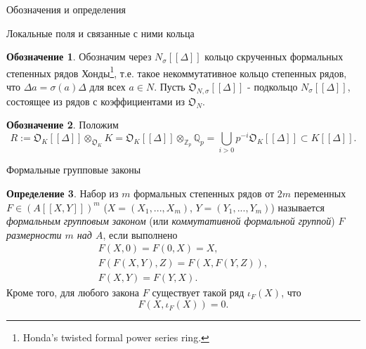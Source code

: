\documentclass[a4paper,14pt]{extarticle}
\theoremstyle{definition}
\newtheorem{definition}{Определение}[section]
\newtheorem{denotation}[definition]{Обозначение}
\newcommand{\bQ}{\mathbb{Q}}
\newcommand{\bZ}{\mathbb{Z}}
\newcommand{\fO}{\mathfrak{O}}
\begin{document}
\begin{section}{Обозначения и определения}
\begin{subsection}{Локальные поля и связанные с ними кольца}
\begin{denotation}\label{denote:1.5:W}
    Обозначим через ${ N_\sigma[[\Delta]] }$ кольцо скрученных формальных степенных рядов Хонды\footnote{
        Honda’s twisted formal power series ring.
    }, т.е. такое некоммутативное кольцо степенных рядов, что ${ \Delta a = \sigma(a) \Delta }$ для всех ${ a \in N }$. Пусть ${ \fO_{N, \sigma}[[\Delta]] }$ - подкольцо ${ N_\sigma[[\Delta]] }$, состоящее из рядов с коэффициентами из $\fO_N$.
\end{denotation}

\begin{denotation}\label{denote:1.3:R}
    Положим
    \begin{equation*}
        R :=
        \fO_K[[\Delta]] \otimes_{\fO_K} K =
        \fO_K[[\Delta]] \otimes_{\bZ_p} \bQ_p =
        \bigcup_{i > 0} p^{-i} \fO_K[[\Delta]] \subset
        K[[\Delta]].
    \end{equation*}
\end{denotation}

\end{subsection}

\begin{subsection}{Формальные групповые законы}

\begin{definition}\label{def:2.0:formal_group}
    Набор из $m$ формальных степенных рядов от ${ 2 m }$ переменных ${ F \in (A[[X, Y]])^m }$ (${ X = (X_1, ..., X_m) }$, ${ Y = (Y_1, ..., Y_m) }$) называется \textit{формальным групповым законом} (или \textit{коммутативной формальной группой}) $F$ \textit{размерности $m$ над $A$}, если выполнено
    \begin{gather*}
        F(X, 0) = F(0, X) = X, \\
        F(F(X, Y), Z) = F(X, F(Y, Z)), \\
        F(X, Y) = F(Y, X).
    \end{gather*}
    Кроме того, для любого закона $F$ существует такой ряд ${ \iota_F(X) }$, что
    \begin{equation*}
        F(X, \iota_F(X)) = 0.
    \end{equation*}
\end{definition}


\end{subsection}
\end{section}
\end{document}
